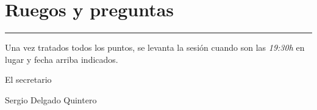 \documentclass[a4paper, 12pt]{article}
\begin{document}
\section{Ruegos y preguntas}


\vspace{1cm}
\hrule
\vspace{3mm}

Una vez tratados todos los puntos, se levanta la sesión cuando son las \textit{19:30h} en lugar y fecha arriba indicados.

\begin{flushright}
El secretario

Sergio Delgado Quintero
\end{flushright}
\end{document}
